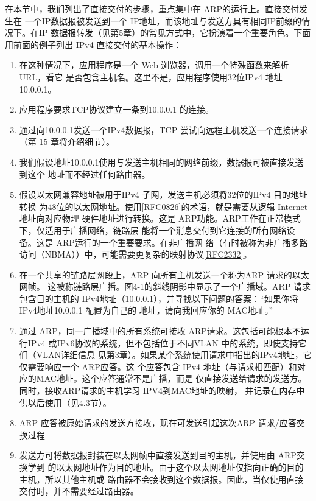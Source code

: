 在本节中，我们列出了直接交付的步骤，重点集中在 ARP的运行上。直接交付发生在
一个IP数据报被发送到一个 IP地址，而该地址与发送方具有相同IP前缀的情况下。在IP
数据报转发（见第5章）的常见方式中，它扮演着一个重要角色。下面用前面的例子列出
IPv4 直接交付的基本操作：
\begin{enumerate}
    \item 在这种情况下，应用程序是一个 Web 浏览器，调用一个特殊函数来解析 URL，看它
    是否包含主机名。这里不是，应用程序使用32位IPv4 地址 10.0.0.1。
    
    \item 应用程序要求TCP协议建立一条到10.0.0.1 的连接。
    
    \item 通过向10.0.0.1发送一个IPv4数据报，TCP 尝试向远程主机发送一个连接请求（第
    15 章将介绍细节）。
    
    \item 我们假设地址10.0.0.1使用与发送主机相同的网络前缀，数据报可被直接发送到这个
    地址而不经过任何路由器。
    
    \item 假设以太网兼容地址被用于IPv4 子网，发送主机必须将32位的IPv4 目的地址转换
    为48位的以太网地址。使用\href{https://www.rfc-editor.org/rfc/rfc0826}{[RFC0826]}的术语，就是需要从逻辑 Internet 地址向对应物理
    硬件地址进行转换。这是 ARP功能。ARP工作在正常模式下，仅适用于广播网络，链路层
    能将一个消息交付到它连接的所有网络设备。这是 ARP运行的一个重要要求。在非广播网
    络（有时被称为非广播多路访问（NBMA））中，可能需要更复杂的映射协议\href{https://www.rfc-editor.org/rfc/rfc2332}{[RFC2332]}。
    
    \item 在一个共享的链路层网段上，ARP 向所有主机发送一个称为ARP 请求的以太网帧。
    这被称链路层广播。图4-1的斜线阴影中显示了一个广播域。ARP 请求包含目的主机的
    IPv4地址（10.0.0.1），并寻找以下问题的答案：“如果你将IPv4地址10.0.0.1 配置为自己的
    地址，请向我回应你的 MAC地址。”
    
    \item 通过 ARP，同一广播域中的所有系统可接收 ARP请求。这包括可能根本不运行IPv4
    或IPv6协议的系统，但不包括位于不同VLAN 中的系统，即使支持它们（VLAN详细信息
    见第3章）。如果某个系统使用请求中指出的IPv4地址，它仅需要响应一个 ARP应答。这
    个应答包含 IPv4 地址（与请求相匹配）和对应的MAC地址。这个应答通常不是广播，而是
    仅直接发送给请求的发送方。同时，接收ARP请求的主机学习 IPV4到MAC地址的映射，
    并记录在内存中供以后使用（见4.3节）。
    
    \item ARP 应答被原始请求的发送方接收，现在可发送引起这次ARP 请求/应答交换过程
    
    \item 发送方可将数据报封装在以太网帧中直接发送到目的主机，并使用由 ARP交换学到
    的以太网地址作为目的地址。由于这个以太网地址仅指向正确的目的主机，所以其他主机或
    路由器不会接收到这个数据报。因此，当仅使用直接交付时，并不需要经过路由器。
\end{enumerate}

